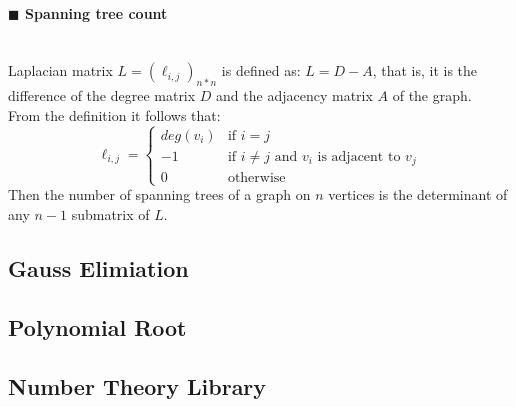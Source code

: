 \documentclass[10pt]{article}
\begin{document}
\paragraph{$\blacksquare$ Spanning tree count}
\noindent \\
Laplacian matrix $L=(\ell_{i,j})_{n*n}$ is defined as: $L=D-A$, that is, it is the difference of the degree matrix $D$ and the adjacency matrix $A$ of the graph. \\
From the definition it follows that:
\begin{displaymath}
\ell_{i,j}=
\left\{ \begin{array}{ll}
deg(v_i) & \textrm{if } i=j \\
-1 & \textrm{if }i\ne j\textrm{ and }v_i\textrm{ is adjacent to }v_j \\
0 & \textrm{otherwise}
\end{array} \right.
\end{displaymath}
Then the number of spanning trees of a graph on $n$ vertices is the determinant of any $n-1$ submatrix of $L$.
\subsection{Gauss Elimiation}

\subsection{Polynomial Root}

\subsection{Number Theory Library}

\end{document}
